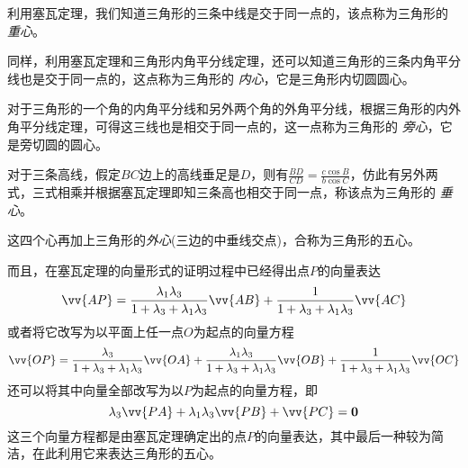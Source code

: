 \begin{example}
 利用塞瓦定理，我们知道三角形的三条中线是交于同一点的，该点称为三角形的 \emph{重心}。

 同样，利用塞瓦定理和三角形内角平分线定理，还可以知道三角形的三条内角平分线也是交于同一点的，这点称为三角形的 \emph{内心}，它是三角形内切圆圆心。

 对于三角形的一个角的内角平分线和另外两个角的外角平分线，根据三角形的内外角平分线定理，可得这三线也是相交于同一点的，这一点称为三角形的 \emph{旁心}，它是旁切圆的圆心。

 对于三条高线，假定$BC$边上的高线垂足是$D$，则有$\frac{BD}{CD}=\frac{c \cos{B}}{b \cos{C}}$，仿此有另外两式，三式相乘并根据塞瓦定理即知三条高也相交于同一点，称该点为三角形的 \emph{垂心}。

这四个心再加上三角形的\emph{外心}(三边的中垂线交点)，合称为三角形的五心。 

而且，在塞瓦定理的向量形式的证明过程中已经得出点$P$的向量表达
\begin{equation}
  \label{eq:pa-pb-pc-vector-with-lambda-1}
  \vv{AP} = \frac{\lambda_1\lambda_3}{1+\lambda_3+\lambda_1\lambda_3} \vv{AB} + \frac{1}{1+\lambda_3+\lambda_1\lambda_3} \vv{AC} 
\end{equation}
 或者将它改写为以平面上任一点$O$为起点的向量方程
 \[ \vv{OP} = \frac{\lambda_3}{1+\lambda_3+\lambda_1\lambda_3} \vv{OA} + \frac{\lambda_1\lambda_3}{1+\lambda_3+\lambda_1\lambda_3} \vv{OB} + \frac{1}{1+\lambda_3+\lambda_1\lambda_3} \vv{OC} \]
 还可以将其中向量全部改写为以$P$为起点的向量方程，即
 \begin{equation}
   \label{eq:pa-pb-pc-vector-with-lambda}
  \lambda_3 \vv{PA} + \lambda_1 \lambda_3 \vv{PB} + \vv{PC} = \bm{0} 
 \end{equation}
 这三个向量方程都是由塞瓦定理确定出的点$P$的向量表达，其中最后一种较为简洁，在此利用它来表达三角形的五心。


\end{example}
